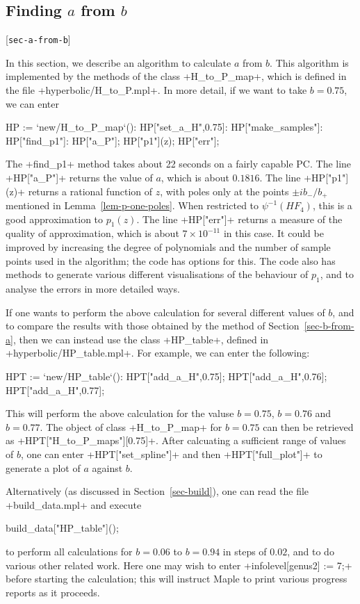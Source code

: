 \documentclass[reqno]{amsart}
\newcommand{\lbl}[1]{\label{#1}\textup{[\texttt{#1}]}\par}
\newcommand{\lbl}{\label}
\newcommand{\tm}        {\times}
\renewcommand{\:}{\colon}
\theoremstyle{definition}
\begin{document}
\subsection{Finding \texorpdfstring{$a$}{a} from \texorpdfstring{$b$}{b}}
\lbl{sec-a-from-b}

In this section, we describe an algorithm to calculate $a$ from $b$.
This algorithm is implemented by the methods of the class
\mcode+H_to_P_map+, which is defined in the file
\fname+hyperbolic/H_to_P.mpl+.  In more detail, if we want to
take $b=0.75$, we can enter
\begin{mcodeblock}
   HP := `new/H_to_P_map`():
   HP["set_a_H",0.75]:
   HP["make_samples"]:
   HP["find_p1"]:
   HP["a_P"];
   HP["p1"](z);
   HP["err"];
\end{mcodeblock}
The \mcode+find_p1+ method takes about 22 seconds on a fairly capable
PC.  The line \mcode+HP["a_P"]+ returns the value of $a$, which is
about $0.1816$.  The line \mcode+HP["p1"](z)+ returns a rational
function of $z$, with poles only at the points $\pm ib_-/b_+$
mentioned in Lemma~\ref{lem-p-one-poles}.  When restricted to
$\psi^{-1}(HF_4)$, this is a good approximation to $p_1(z)$.  The line
\mcode+HP["err"]+ returns a measure of the quality of approximation,
which is about $7\tm 10^{-11}$ in this case.  It could be improved by
increasing the degree of polynomials and the number of sample points
used in the algorithm; the code has options for this.  The code also
has methods to generate various different visualisations of the
behaviour of $p_1$, and to analyse the errors in more detailed ways.

If one wants to perform the above calculation for several different
values of $b$, and to compare the results with those obtained by the
method of Section~\ref{sec-b-from-a}, then we can instead use the
class \mcode+HP_table+, defined in \fname+hyperbolic/HP_table.mpl+.
For example, we can enter the following:
\begin{mcodeblock}
   HPT := `new/HP_table`():
   HPT["add_a_H",0.75];
   HPT["add_a_H",0.76];
   HPT["add_a_H",0.77];
\end{mcodeblock}
This will perform the above calculation for the valuse $b=0.75$,
$b=0.76$ and $b=0.77$.  The object of class \mcode+H_to_P_map+ for
$b=0.75$ can then be retrieved as \mcode+HPT["H_to_P_maps"][0.75]+.
After calcuating a sufficient range of values of $b$, one can enter
\mcode+HPT["set_spline"]+ and then \mcode+HPT["full_plot"]+ to
generate a plot of $a$ against $b$.

Alternatively (as discussed in Section~\ref{sec-build}), one can read
the file \fname+build_data.mpl+ and execute
\begin{mcodeblock}
   build_data["HP_table"](); 
\end{mcodeblock}
to perform all calculations for
$b=0.06$ to $b=0.94$ in steps of $0.02$, and to do various other
related work.  Here one may wish to enter 
\mcode+infolevel[genus2] := 7;+ before starting the calculation; this
will instruct Maple to print various progress reports as it proceeds.
\end{document}
